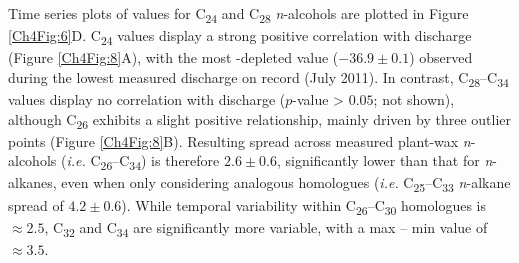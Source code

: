 Time series plots of  values for C\textsubscript{24} and C\textsubscript{28} \textit{n}-alcohols are plotted in Figure \ref{Ch4Fig:6}D. C\textsubscript{24}  values display a strong positive correlation with discharge (Figure \ref{Ch4Fig:8}A), with the most -depleted value ($-36.9 \pm 0.1$\textperthousand) observed during the lowest measured discharge on record (July 2011). In contrast, C\textsubscript{28}--C\textsubscript{34}  values display no correlation with discharge ($p$-value > $0.05$; not shown), although C\textsubscript{26} exhibits a slight positive relationship, mainly driven by three outlier points (Figure \ref{Ch4Fig:8}B). Resulting  spread across measured plant-wax \textit{n}-alcohols (\textit{\textit{i.e.}} C\textsubscript{26}--C\textsubscript{34}) is therefore $2.6 \pm 0.6$\textperthousand, significantly lower than that for \textit{n}-alkanes, even when only considering analogous homologues (\textit{i.e.} C\textsubscript{25}--C\textsubscript{33} \textit{n}-alkane spread of $4.2 \pm 0.6$\textperthousand). While temporal variability within C\textsubscript{26}--C\textsubscript{30} homologues is $\approx 2.5$\textperthousand, C\textsubscript{32} and C\textsubscript{34} are significantly more variable, with a max -- min value of $\approx 3.5$\textperthousand. 


